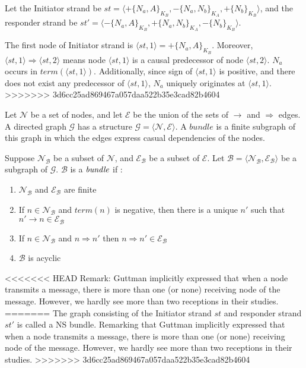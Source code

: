Let  the Initiator strand be $st = \langle +\{N_a,A\}_{K_B}, -\{N_a,N_b\}_{K_A},+\{N_b\}_{K_B} \rangle$, and the responder strand be $st' = \langle -\{N_a,A\}_{K_B}, +\{N_a,N_b\}_{K_A},-\{N_b\}_{K_B} \rangle$.

The first node of Initiator strand is $\langle st,1 \rangle = +\{N_a,A\}_{K_B}$. Moreover, $\langle st,1 \rangle \Rightarrow \langle st,2 \rangle$ means node $\langle st,1 \rangle$ is a causal predecessor of node $\langle st,2 \rangle$. $N_a$ occurs in $term(\langle st,1 \rangle)$. Additionally, since sign of $\langle st,1 \rangle$ is positive, and there does not exist any predecessor of $\langle st,1 \rangle$, $N_a$ uniquely originates at $\langle st,1 \rangle$.  
>>>>>>> 3d6cc25ad869467a057daa522b35e3cad82b4604
	
Let $\mathcal{N}$ be a set of nodes, and let $\mathcal{E}$ be the union of the sets of $\rightarrow$ and $\Rightarrow$ edges. A directed graph $\mathcal{G}$ has a structure $\mathcal{G} = \langle \mathcal{N},\mathcal{E}\rangle$. A $bundle$ is a finite subgraph of this graph in which the edges express casual dependencies of the nodes.

\begin{Definition} Suppose $\mathcal{N_B}$ be a subset of $\mathcal{N}$, and $\mathcal{E_B}$ be a subset of $\mathcal{E}$. Let $\mathcal{B} = \langle \mathcal{N_B},\mathcal{E_B}\rangle$ be a subgraph of $\mathcal{G}$. $\mathcal{B}$ is a $\emph{bundle}$ if :
\begin{enumerate}
\item $\mathcal{N_B}$ and $\mathcal{E_B}$ are finite
\item If $n \in \mathcal{N_B}$ and $term(n)$ is negative, then there is a unique $n'$ such that $ n' \rightarrow n \in \mathcal{E_B}$
\item If $n \in \mathcal{N_B}$ and $n \Rightarrow n'$ then $n \Rightarrow n' \in \mathcal{E_B}$ 
\item $\mathcal{B}$ is acyclic
\end{enumerate}
\end{Definition}

<<<<<<< HEAD
Remark: Guttman implicitly expressed that when a node transmits a message, there is more than one (or none) receiving node of the message. However, we hardly see more than two receptions in their studies. 
=======
The graph consisting of the Initiator strand $st$ and responder strand $st'$ is called a NS bundle. Remarking that Guttman implicitly expressed that when a node transmits a message, there is more than one (or none) receiving node of the message. However, we hardly see more than two receptions in their studies. 
>>>>>>> 3d6cc25ad869467a057daa522b35e3cad82b4604

